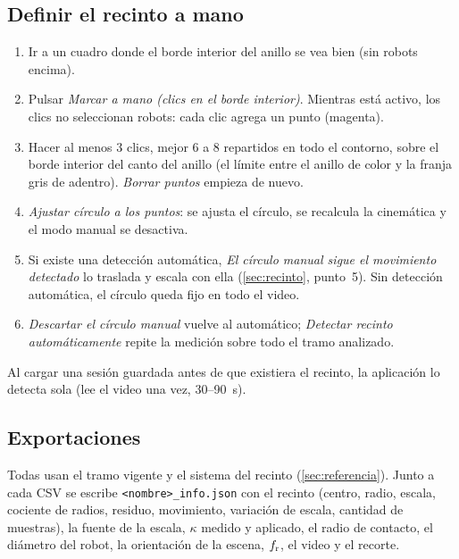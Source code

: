 \subsection{Definir el recinto a mano}\label{paso:manual}

\begin{enumerate}
  \item Ir a un cuadro donde el borde interior del anillo se vea bien (sin robots encima).
  \item Pulsar \emph{Marcar a mano (clics en el borde interior)}. Mientras está activo, los clics no
        seleccionan robots: cada clic agrega un punto (magenta).
  \item Hacer al menos 3 clics, mejor 6 a 8 repartidos en todo el contorno, sobre el borde interior del
        canto del anillo (el límite entre el anillo de color y la franja gris de adentro). \emph{Borrar
        puntos} empieza de nuevo.
  \item \emph{Ajustar círculo a los puntos}: se ajusta el círculo, se recalcula la cinemática y el modo
        manual se desactiva.
  \item Si existe una detección automática, \emph{El círculo manual sigue el movimiento detectado} lo
        traslada y escala con ella (\cref{sec:recinto}, punto~5). Sin detección automática, el círculo
        queda fijo en todo el video.
  \item \emph{Descartar el círculo manual} vuelve al automático; \emph{Detectar recinto
        automáticamente} repite la medición sobre todo el tramo analizado.
\end{enumerate}
Al cargar una sesión guardada antes de que existiera el recinto, la aplicación lo detecta sola
(lee el video una vez, \num{30}--\SI{90}{\second}).

\subsection{Exportaciones}\label{sec:exportar}

Todas usan el tramo vigente y el sistema del recinto (\cref{sec:referencia}). Junto a cada CSV se escribe
\texttt{<nombre>\_info.json} con el recinto (centro, radio, escala, cociente de radios, residuo,
movimiento, variación de escala, cantidad de muestras), la fuente de la escala, $\kappa$ medido y
aplicado, el radio de contacto, el diámetro del robot, la orientación de la escena, $f_{\mathrm{r}}$, el video y el recorte.

